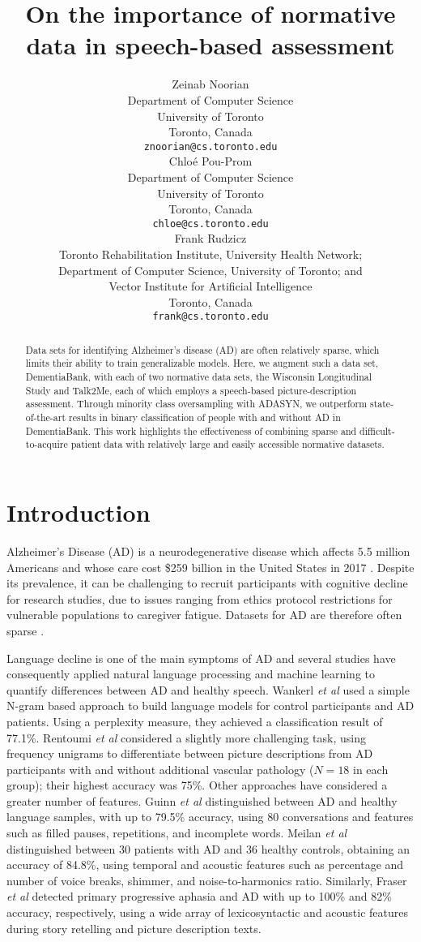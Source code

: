 \documentclass{article}
\title{On the importance of normative data in speech-based assessment}
\author{
  Zeinab Noorian\\
  Department of Computer Science\\
  University of Toronto\\
  Toronto, Canada \\
  \texttt{znoorian@cs.toronto.edu} \\
 \And
 Chlo\'{e} Pou-Prom \\
 Department of Computer Science \\
University of Toronto \\
Toronto, Canada \\
 \texttt{chloe@cs.toronto.edu} \\
 \And
 Frank Rudzicz \\
 Toronto Rehabilitation Institute,  University Health Network; \\
 Department of Computer  Science, University of Toronto; and \\
 Vector Institute for Artificial Intelligence\\
 Toronto, Canada\\
 \texttt{frank@cs.toronto.edu} \\
}
\begin{document}

\maketitle

\begin{abstract}
Data sets for identifying Alzheimer's disease (AD) are often relatively sparse, which limits their ability to train generalizable models. Here, we augment such a data set, DementiaBank, with each of two normative data sets, the Wisconsin Longitudinal Study and Talk2Me, each of which employs a speech-based picture-description assessment. Through minority class oversampling with ADASYN, we outperform state-of-the-art results in binary classification of people with and without AD in DementiaBank. This work highlights the effectiveness of combining sparse and difficult-to-acquire patient data with relatively large and easily accessible normative datasets.
\end{abstract}

\section{Introduction}

Alzheimer's Disease (AD) is a neurodegenerative disease which affects 5.5 million Americans and whose care cost \$259 billion in the United States in 2017 \cite{Association2017}. Despite its prevalence, it can be challenging to recruit participants with cognitive decline for research studies, due to issues ranging from ethics protocol restrictions for vulnerable populations to caregiver fatigue. Datasets for AD are therefore often sparse \cite{Rentoumi2014}.

Language decline is one of the main symptoms of AD and several studies have consequently applied natural language processing and machine learning to quantify differences between AD and healthy speech. Wankerl {\em et al} \cite{Wankerl2017} used a simple N-gram based approach to build language models for control participants and AD patients. Using a perplexity measure, they achieved a classification result of 77.1\%.  Rentoumi {\em et al} \cite{Rentoumi2014} considered a slightly more challenging task, using frequency unigrams to differentiate between picture descriptions from AD participants with and without additional vascular pathology ($N=18$ in each group); their highest accuracy was 75\%. Other approaches have considered a greater number of features. Guinn {\em et al} \cite{Guinn2012} distinguished between AD and healthy language samples, with up to 79.5\% accuracy, using 80 conversations and features such as filled pauses, repetitions, and incomplete words. Meilan {\em et al} \cite{Meilan2014} distinguished between 30 patients with AD and 36 healthy controls, obtaining an accuracy of 84.8\%, using temporal and acoustic features such as percentage and number of voice breaks, shimmer, and noise-to-harmonics ratio. Similarly, Fraser {\em et al} detected primary progressive aphasia \cite{Fraser:2013} and AD \cite{Fraser2015} with up to 100\% and 82\% accuracy, respectively, using a wide array of lexicosyntactic and acoustic features during story retelling and picture description texts. 
\end{document}
